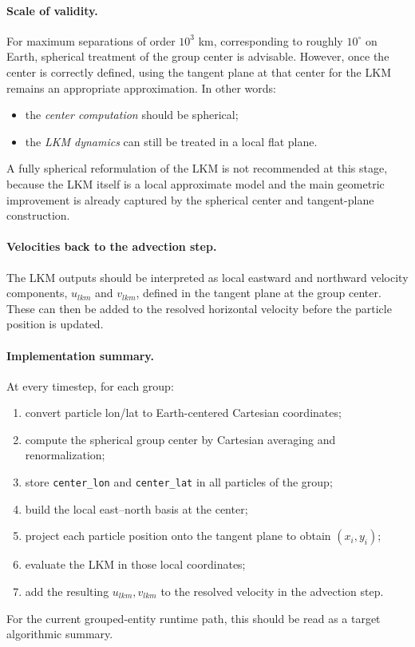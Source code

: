 \documentclass[11pt,a4paper]{article}
\begin{document}
	\paragraph{Scale of validity.}
	For maximum separations of order $10^3$ km, corresponding to roughly $10^\circ$ on Earth, spherical treatment of the group center is advisable. However, once the center is correctly defined, using the tangent plane at that center for the LKM remains an appropriate approximation. In other words:
	\begin{itemize}
		\item the \emph{center computation} should be spherical;
		\item the \emph{LKM dynamics} can still be treated in a local flat plane.
	\end{itemize}
	
	A fully spherical reformulation of the LKM is not recommended at this stage, because the LKM itself is a local approximate model and the main geometric improvement is already captured by the spherical center and tangent-plane construction.
	
	\paragraph{Velocities back to the advection step.}
	The LKM outputs should be interpreted as local eastward and northward velocity components, $u_{lkm}$ and $v_{lkm}$, defined in the tangent plane at the group center. These can then be added to the resolved horizontal velocity before the particle position is updated.
	
	\paragraph{Implementation summary.}
	At every timestep, for each group:
	\begin{enumerate}
		\item convert particle lon/lat to Earth-centered Cartesian coordinates;
		\item compute the spherical group center by Cartesian averaging and renormalization;
		\item store \texttt{center\_lon} and \texttt{center\_lat} in all particles of the group;
		\item build the local east--north basis at the center;
		\item project each particle position onto the tangent plane to obtain $(x_i,y_i)$;
		\item evaluate the LKM in those local coordinates;
		\item add the resulting $u_{lkm}, v_{lkm}$ to the resolved velocity in the advection step.
	\end{enumerate}
	For the current grouped-entity runtime path, this should be read as a target algorithmic summary.
	
\end{document}
